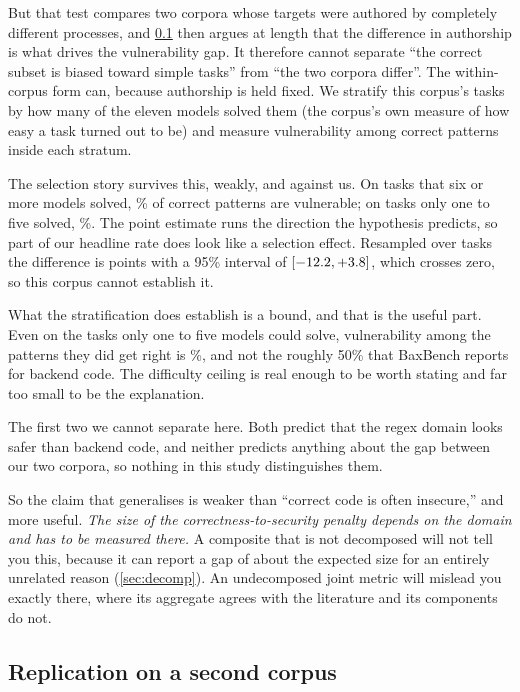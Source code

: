 \documentclass[11pt]{article}
\begin{document}
But that test compares two corpora whose targets were authored by completely
different processes, and \cref{sec:replication} then argues at length that the
difference in authorship is what drives the vulnerability gap. It therefore
cannot separate ``the correct subset is biased toward simple tasks'' from
``the two corpora differ''. The within-corpus form can, because authorship is
held fixed. We stratify this corpus's tasks by how many of the eleven models
solved them (the corpus's own measure of how easy a task turned out to be) and
measure vulnerability among correct patterns inside each stratum.

The selection story survives this, weakly, and against us. On tasks that six
or more models solved, \easyvuln{}\% of correct patterns are vulnerable; on
tasks only one to five solved, \hardvuln{}\%. The point estimate runs the
direction the hypothesis predicts, so part of our headline rate does look like
a selection effect. Resampled over tasks the difference is
\easyhard{} points with a 95\% interval of $[-12.2{},
+3.8{}]$, which crosses zero, so this corpus cannot establish it.

What the stratification does establish is a bound, and that is the useful
part. Even on the tasks only one to five models could solve, vulnerability
among the patterns they did get right is \hardvuln{}\%, and not the roughly
50\% that BaxBench reports for backend code. The difficulty ceiling is real
enough to be worth stating and far too small to be the explanation.

The first two we cannot separate here. Both predict that the regex domain
looks safer than backend code, and neither predicts anything about the gap
between our two corpora, so nothing in this study distinguishes them.

So the claim that generalises is weaker than ``correct code is often
insecure,'' and more useful. \emph{The size of the correctness-to-security
penalty depends on the domain and has to be measured there.} A composite that
is not decomposed will not tell you this, because it can report a gap of about
the expected size for an entirely unrelated reason
(\cref{sec:decomp}). An undecomposed joint metric will mislead you exactly
there, where its aggregate agrees with the literature and its components do
not.

\subsection{Replication on a second corpus}
\label{sec:replication}
\end{document}
